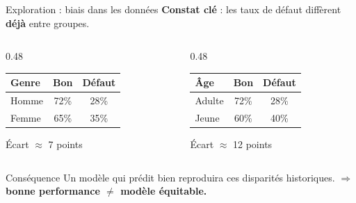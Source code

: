 \documentclass[aspectratio=169, 11pt]{beamer}
\begin{document}
\begin{frame}{Exploration : biais dans les donn\'ees}
\textbf{Constat cl\'e} : les taux de d\'efaut diff\`erent \textbf{d\'ej\`a} entre groupes.

\vspace{0.5em}
\begin{columns}[T]
\begin{column}{0.48\textwidth}
\centering
\begin{tabular}{lcc}
\toprule
\textbf{Genre} & \textbf{Bon} & \textbf{D\'efaut} \\
\midrule
Homme & 72\% & 28\% \\
Femme & 65\% & 35\% \\
\bottomrule
\end{tabular}

\vspace{0.3em}
\scriptsize \'Ecart $\approx$ 7 points
\end{column}
\begin{column}{0.48\textwidth}
\centering
\begin{tabular}{lcc}
\toprule
\textbf{\^Age} & \textbf{Bon} & \textbf{D\'efaut} \\
\midrule
Adulte & 72\% & 28\% \\
Jeune & 60\% & 40\% \\
\bottomrule
\end{tabular}

\vspace{0.3em}
\scriptsize \'Ecart $\approx$ 12 points
\end{column}
\end{columns}

\vspace{1em}
\begin{alertblock}{Cons\'equence}
Un mod\`ele qui pr\'edit bien reproduira ces disparit\'es historiques.
$\Rightarrow$ \textbf{bonne performance $\neq$ mod\`ele \'equitable.}
\end{alertblock}
\end{frame}
\end{document}
